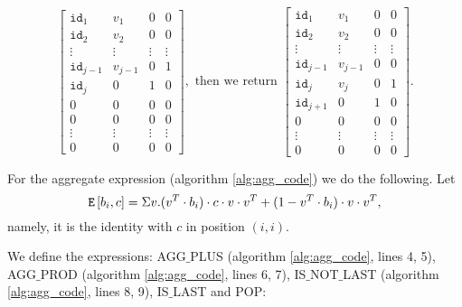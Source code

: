     \[
    \begin{bmatrix}
        \texttt{id}_1 & v_1 & 0 & 0 \\
        \texttt{id}_2 & v_2 & 0 & 0 \\
        \vdots & \vdots & \vdots & \vdots \\
        \texttt{id}_{j-1} & v_{j-1} & 0 & 1 \\
        \texttt{id}_j & 0 & 1 & 0 \\
        0 & 0 & 0 & 0 \\
        0 & 0 & 0 & 0 \\
        \vdots & \vdots & \vdots & \vdots \\
        0 & 0 & 0 & 0
    \end{bmatrix}, \text{ then we return }
    \begin{bmatrix}
        \texttt{id}_1 & v_1 & 0 & 0 \\
        \texttt{id}_2 & v_2 & 0 & 0 \\
        \vdots & \vdots & \vdots & \vdots \\
        \texttt{id}_{j-1} & v_{j-1} & 0 & 0 \\
        \texttt{id}_j & v_j & 0 & 1 \\
        \texttt{id}_{j+1} & 0 & 1 & 0 \\
        0 & 0 & 0 & 0 \\
        \vdots & \vdots & \vdots & \vdots \\
        0 & 0 & 0 & 0
    \end{bmatrix}.
    \]


    For the aggregate expression (algorithm \ref{alg:agg_code}) we do the following. Let $$\texttt{E}\left[ b_i, c \right]=\Sigma v. (v^T\cdot b_i)\cdot c\cdot v\cdot v^T + (1-v^T\cdot b_i)\cdot v \cdot v^T,$$ namely, it is the identity with $c$ in position $(i,i)$.

    We define the expressions: AGG${\_}$PLUS (algorithm \ref{alg:agg_code}, lines 4, 5), AGG${\_}$PROD (algorithm \ref{alg:agg_code}, lines 6, 7),  IS${\_}$NOT${\_}$LAST (algorithm \ref{alg:agg_code}, lines 8, 9), IS${\_}$LAST and POP:

